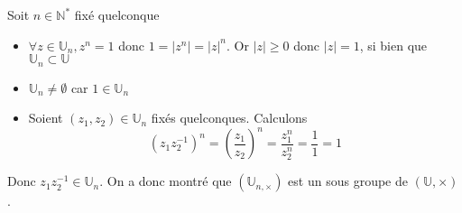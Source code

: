 \documentclass{article}
\begin{document}
Soit $n \in \mathbb{N}^{*}$ fixé quelconque
\begin{itemize}[label=$\star$]
    \item $\forall z \in \mathbb{U}_{n}, z^{n} = 1$ donc $1 = \lvert  z^{n} \rvert = \lvert z \rvert^{n}$. Or $\lvert z \rvert \geqslant 0$ donc $\lvert z \rvert = 1$, si bien que $\mathbb{U}_{n} \subset \mathbb{U}$
    
    \item $\mathbb{U}_{n} \neq \emptyset$ car $1 \in \mathbb{U}_{n}$
    
    \item Soient $(z_{1}, z_{2}) \in \mathbb{U}_{n}$ fixés quelconques.
    Calculons
    $$
    (z_{1}z_{2}^{-1})^{n} = \left( \frac{z_{1}}{z_{2}} \right)^{n} = \frac{z_{1}^{n}}{z_{2}^{n}} = \frac{1}{1} = 1
    $$
\end{itemize}
Donc $z_{1}z_{2}^{-1} \in \mathbb{U}_{n}$. On a donc montré que $(\mathbb{U}_{n, \times})$ est un sous groupe de $(\mathbb{U}, \times)$.
\end{document}
